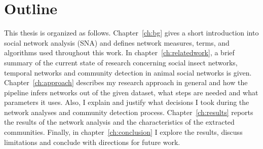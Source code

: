 \section{Outline}
This thesis is organized as follows. Chapter~\ref{ch:bg} gives a short introduction into social network analysis (SNA) and defines network measures, terms, and algorithms used throughout this work.
In chapter~\ref{ch:relatedwork}, a brief summary of the current state of research concerning social insect networks, temporal networks and community detection in animal social networks is given.
Chapter~\ref{ch:approach} describes my research approach in general and how the pipeline infers networks out of the given dataset, what steps are needed and what parameters it uses.
Also, I explain and justify what decisions I took during the network analyses and community detection process.
Chapter~\ref{ch:results} reports the results of the network analysis and the characteristics of the extracted communities.
Finally, in chapter~\ref{ch:conclusion} I explore the results, discuss limitations and conclude with directions for future work.